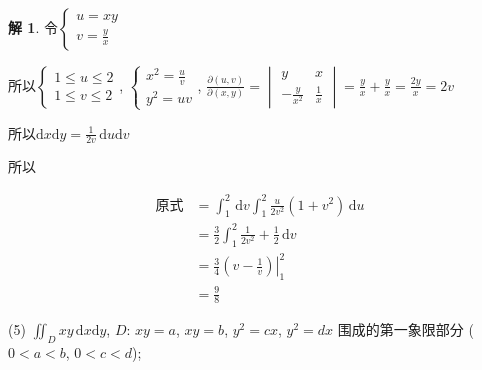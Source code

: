 \documentclass[a4paper,12pt]{article}
\theoremstyle{definition}
\newtheorem*{sol}{解}
\begin{document}
\begin{sol}
    令$\begin{cases}
            u=xy \\
            v=\frac{y}{x}
        \end{cases}$

    所以$\begin{cases}
            1\leq u\leq 2 \\
            1\leq v\leq 2
        \end{cases}$, $\begin{cases}
            x^2=\frac{u}{v} \\
            y^2=uv
        \end{cases}$, $\frac{\partial(u,v)}{\partial(x,y)}=\begin{vmatrix}
            y              & x           \\
            -\frac{y}{x^2} & \frac{1}{x}
        \end{vmatrix}=\frac{y}{x}+\frac{y}{x}=\frac{2y}{x}=2v$

    所以$\mathrm{d}x\mathrm{d}y=\frac{1}{2v}\,\mathrm{d}u\mathrm{d}v$

    所以

    \begin{align*}
        \text{原式}
         & =\int_1^2\,\mathrm{d}v\int_1^2\frac{u}{2v^2}(1+v^2)\,\mathrm{d}u \\
         & =\frac{3}{2}\int_1^2\frac{1}{2v^2}+\frac{1}{2}\,\mathrm{d}v      \\
         & =\frac{3}{4}\left.(v-\frac{1}{v})\right|_1^2                     \\
         & =\frac{9}{8}
    \end{align*}
\end{sol}
(5) $\displaystyle\iint_{D} xy\,\mathrm{d}x\mathrm{d}y$, $D$: $xy=a$, $xy=b$, $y^2=cx$, $y^2=dx$ 围成的第一象限部分 ($0 < a < b$, $0 < c < d$);
\end{document}
